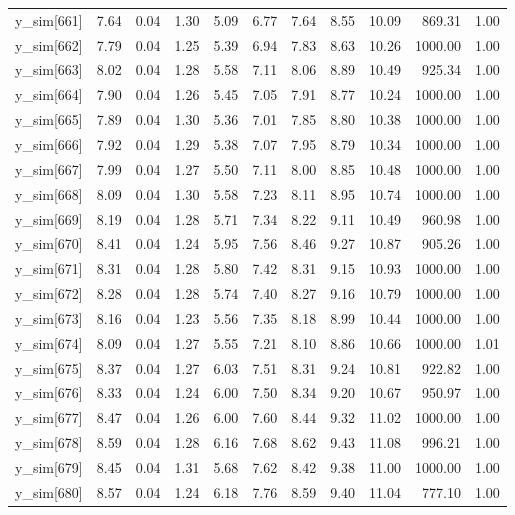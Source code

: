 \begin{table}[ht]
\begin{tabular}{rrrrrrrrrrr}
  y\_sim[661] & 7.64 & 0.04 & 1.30 & 5.09 & 6.77 & 7.64 & 8.55 & 10.09 & 869.31 & 1.00 \\ 
  y\_sim[662] & 7.79 & 0.04 & 1.25 & 5.39 & 6.94 & 7.83 & 8.63 & 10.26 & 1000.00 & 1.00 \\ 
  y\_sim[663] & 8.02 & 0.04 & 1.28 & 5.58 & 7.11 & 8.06 & 8.89 & 10.49 & 925.34 & 1.00 \\ 
  y\_sim[664] & 7.90 & 0.04 & 1.26 & 5.45 & 7.05 & 7.91 & 8.77 & 10.24 & 1000.00 & 1.00 \\ 
  y\_sim[665] & 7.89 & 0.04 & 1.30 & 5.36 & 7.01 & 7.85 & 8.80 & 10.38 & 1000.00 & 1.00 \\ 
  y\_sim[666] & 7.92 & 0.04 & 1.29 & 5.38 & 7.07 & 7.95 & 8.79 & 10.34 & 1000.00 & 1.00 \\ 
  y\_sim[667] & 7.99 & 0.04 & 1.27 & 5.50 & 7.11 & 8.00 & 8.85 & 10.48 & 1000.00 & 1.00 \\ 
  y\_sim[668] & 8.09 & 0.04 & 1.30 & 5.58 & 7.23 & 8.11 & 8.95 & 10.74 & 1000.00 & 1.00 \\ 
  y\_sim[669] & 8.19 & 0.04 & 1.28 & 5.71 & 7.34 & 8.22 & 9.11 & 10.49 & 960.98 & 1.00 \\ 
  y\_sim[670] & 8.41 & 0.04 & 1.24 & 5.95 & 7.56 & 8.46 & 9.27 & 10.87 & 905.26 & 1.00 \\ 
  y\_sim[671] & 8.31 & 0.04 & 1.28 & 5.80 & 7.42 & 8.31 & 9.15 & 10.93 & 1000.00 & 1.00 \\ 
  y\_sim[672] & 8.28 & 0.04 & 1.28 & 5.74 & 7.40 & 8.27 & 9.16 & 10.79 & 1000.00 & 1.00 \\ 
  y\_sim[673] & 8.16 & 0.04 & 1.23 & 5.56 & 7.35 & 8.18 & 8.99 & 10.44 & 1000.00 & 1.00 \\ 
  y\_sim[674] & 8.09 & 0.04 & 1.27 & 5.55 & 7.21 & 8.10 & 8.86 & 10.66 & 1000.00 & 1.01 \\ 
  y\_sim[675] & 8.37 & 0.04 & 1.27 & 6.03 & 7.51 & 8.31 & 9.24 & 10.81 & 922.82 & 1.00 \\ 
  y\_sim[676] & 8.33 & 0.04 & 1.24 & 6.00 & 7.50 & 8.34 & 9.20 & 10.67 & 950.97 & 1.00 \\ 
  y\_sim[677] & 8.47 & 0.04 & 1.26 & 6.00 & 7.60 & 8.44 & 9.32 & 11.02 & 1000.00 & 1.00 \\ 
  y\_sim[678] & 8.59 & 0.04 & 1.28 & 6.16 & 7.68 & 8.62 & 9.43 & 11.08 & 996.21 & 1.00 \\ 
  y\_sim[679] & 8.45 & 0.04 & 1.31 & 5.68 & 7.62 & 8.42 & 9.38 & 11.00 & 1000.00 & 1.00 \\ 
  y\_sim[680] & 8.57 & 0.04 & 1.24 & 6.18 & 7.76 & 8.59 & 9.40 & 11.04 & 777.10 & 1.00 \\ 

\end{tabular}
\end{table}
